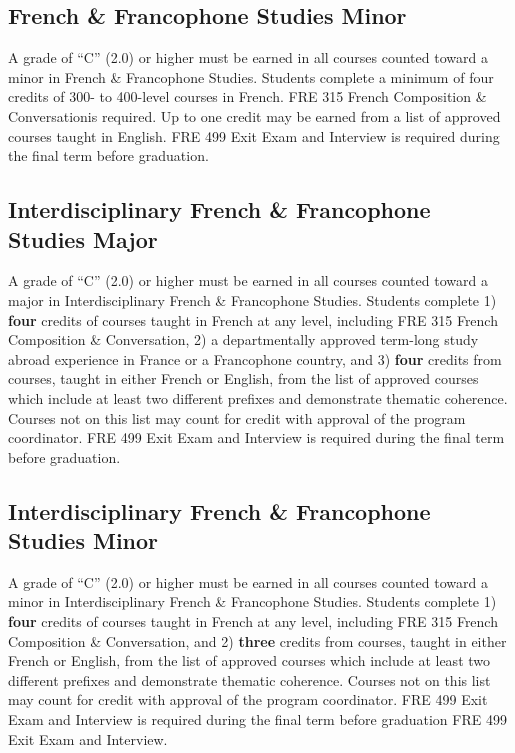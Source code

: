 \documentclass[
  letterpaper,
]{scrbook}
\begin{document}
\subsection{French \& Francophone Studies
Minor}\label{french-francophone-studies-minor}

A grade of ``C'' (2.0) or higher must be earned in all courses counted
toward a minor in French \& Francophone Studies. Students complete a
minimum of four credits of 300- to 400-level courses in French. FRE 315
French Composition \& Conversationis required. Up to one credit may be
earned from a list of approved courses taught in English. FRE 499 Exit
Exam and Interview is required during the final term before graduation.

\subsection{Interdisciplinary French \& Francophone Studies
Major}\label{interdisciplinary-french-francophone-studies-major}

A grade of ``C'' (2.0) or higher must be earned in all courses counted
toward a major in Interdisciplinary French \& Francophone Studies.
Students complete 1) \textbf{four} credits of courses taught in French
at any level, including FRE 315 French Composition \& Conversation, 2) a
departmentally approved term-long study abroad experience in France or a
Francophone country, and 3) \textbf{four} credits from courses, taught
in either French or English, from the list of approved courses which
include at least two different prefixes and demonstrate thematic
coherence. Courses not on this list may count for credit with approval
of the program coordinator. FRE 499 Exit Exam and Interview is required
during the final term before graduation.

\subsection{Interdisciplinary French \& Francophone Studies
Minor}\label{interdisciplinary-french-francophone-studies-minor}

A grade of ``C'' (2.0) or higher must be earned in all courses counted
toward a minor in Interdisciplinary French \& Francophone Studies.
Students complete 1) \textbf{four} credits of courses taught in French
at any level, including FRE 315 French Composition \& Conversation, and
2) \textbf{three} credits from courses, taught in either French or
English, from the list of approved courses which include at least two
different prefixes and demonstrate thematic coherence. Courses not on
this list may count for credit with approval of the program coordinator.
FRE 499 Exit Exam and Interview is required during the final term before
graduation FRE 499 Exit Exam and Interview.
\end{document}
